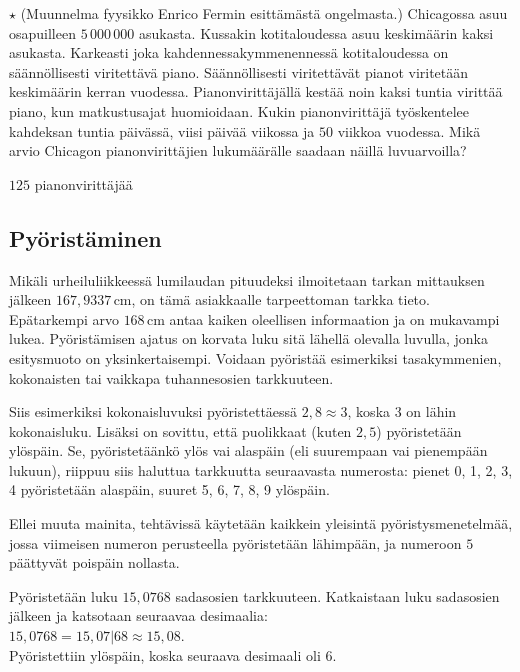 \begin{tehtavasivu}
\begin{tehtava}
$\star$ (Muunnelma fyysikko Enrico Fermin esittämästä ongelmasta.) Chicagossa asuu osapuilleen $5\,000\,000$ asukasta. Kussakin kotitaloudessa asuu keskimäärin kaksi asukasta. Karkeasti joka kahdennessakymmenennessä kotitaloudessa on säännöllisesti viritettävä piano. Säännöllisesti viritettävät pianot viritetään keskimäärin kerran vuodessa. Pianonvirittäjällä kestää noin kaksi tuntia virittää piano, kun matkustusajat huomioidaan. Kukin pianonvirittäjä työskentelee kahdeksan tuntia päivässä, viisi päivää viikossa ja $50$ viikkoa vuodessa. Mikä arvio Chicagon pianonvirittäjien lukumäärälle saadaan näillä luvuarvoilla?
\begin{vastaus}
$125$ pianonvirittäjää
\end{vastaus}
\end{tehtava}

\end{tehtavasivu}

\subsection*{Pyöristäminen}

Mikäli urheiluliikkeessä lumilaudan pituudeksi ilmoitetaan tarkan mittauksen jälkeen $167,9337$\,cm, on tämä asiakkaalle tarpeettoman tarkka tieto. Epätarkempi arvo $168$\,cm antaa kaiken oleellisen informaation ja on mukavampi lukea. Pyöristämisen ajatus on korvata luku sitä lähellä olevalla luvulla, jonka esitysmuoto on yksinkertaisempi. Voidaan pyöristää esimerkiksi tasakymmenien, kokonaisten tai vaikkapa tuhannesosien tarkkuuteen.



Siis esimerkiksi kokonaisluvuksi pyöristettäessä $2,8 \approx 3$, koska $3$ on lähin kokonaisluku. Lisäksi on sovittu, että puolikkaat (kuten $2,5$) pyöristetään ylöspäin. Se, pyöristetäänkö ylös vai alaspäin (eli suurempaan vai pienempään lukuun), riippuu siis haluttua tarkkuutta seuraavasta numerosta: pienet 0, 1, 2, 3, 4 pyöristetään alaspäin, suuret 5, 6, 7, 8, 9 ylöspäin.

Ellei muuta mainita, tehtävissä käytetään kaikkein yleisintä pyöristysmenetelmää, jossa viimeisen numeron perusteella pyöristetään lähimpään, ja numeroon $5$ päättyvät poispäin nollasta.

\begin{esimerkki}
Pyöristetään luku $15,0768$ sadasosien tarkkuuteen. Katkaistaan luku sadasosien jälkeen ja katsotaan seuraavaa desimaalia:\\
$15,0768 = 15,07|68 \approx 15,08$.\\
Pyöristettiin ylöspäin, koska seuraava desimaali oli 6.
\end{esimerkki}

